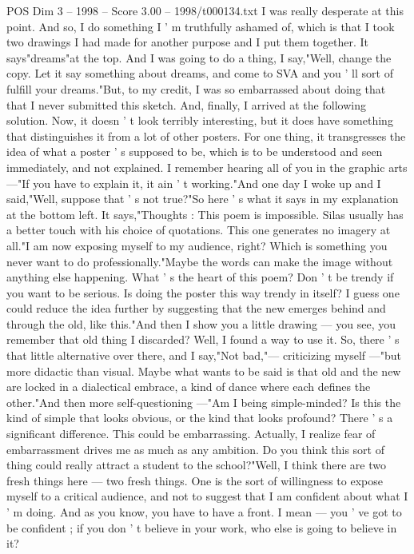 \begin{textsample}{POS Dim 3 – 1998 – Score 3.00 – 1998/t000134.txt}
I was really desperate at this point.
And so, I do something I ' m truthfully ashamed of, which is that I took two drawings I had made for another purpose and I put them together.
It says"dreams"at the top.
And I was going to do a thing, I say,"Well, change the copy.
Let it say something about dreams, and come to SVA and you ' ll sort of fulfill your dreams."But, to my credit, I was so embarrassed about doing that that I never submitted this sketch.
And, finally, I arrived at the following solution.
Now, it doesn ' t look terribly interesting, but it does have something that distinguishes it from a lot of other posters.
For one thing, it transgresses the idea of what a poster ' s supposed to be, which is to be understood and seen immediately, and not explained.
I remember hearing all of you in the graphic arts —"If you have to explain it, it ain ' t working."And one day I woke up and I said,"Well, suppose that ' s not true?"So here ' s what it says in my explanation at the bottom left.
It says,"Thoughts : This poem is impossible.
Silas usually has a better touch with his choice of quotations.
This one generates no imagery at all."I am now exposing myself to my audience, right?
Which is something you never want to do professionally."Maybe the words can make the image without anything else happening.
What ' s the heart of this poem?
Don ' t be trendy if you want to be serious.
Is doing the poster this way trendy in itself?
I guess one could reduce the idea further by suggesting that the new emerges behind and through the old, like this."And then I show you a little drawing — you see, you remember that old thing I discarded?
Well, I found a way to use it.
So, there ' s that little alternative over there, and I say,"Not bad,"— criticizing myself —"but more didactic than visual.
Maybe what wants to be said is that old and the new are locked in a dialectical embrace, a kind of dance where each defines the other."And then more self-questioning —"Am I being simple-minded?
Is this the kind of simple that looks obvious, or the kind that looks profound?
There ' s a significant difference.
This could be embarrassing.
Actually, I realize fear of embarrassment drives me as much as any ambition.
Do you think this sort of thing could really attract a student to the school?"Well, I think there are two fresh things here — two fresh things.
One is the sort of willingness to expose myself to a critical audience, and not to suggest that I am confident about what I ' m doing.
And as you know, you have to have a front.
I mean — you ' ve got to be confident ; if you don ' t believe in your work, who else is going to believe in it?

\end{textsample}
